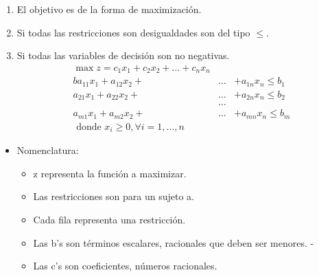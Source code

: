 \documentclass[12pt, twoside, openright]{report} %
\begin{document}
    \begin{enumerate}
    \def\labelenumi{\arabic{enumi}.}
    \item
      El objetivo es de la forma de maximización.
    \item
      Si todas las restricciones son desigualdades son del tipo $\leq$.
    \item
      Si todas las variables de decisión son no negativas.
	  \begin{eqnarray*} 
		\max z = c_1x_1+c_2x_2 + \ldots +c_nx_n \\ 
		ba_{11}x_1 +a_{12}x_2 +&\ldots& +a_{1n}x_n \leq b_1 \\ 
		a_{21}x_1 +a_{22}x_2 +&\ldots& +a_{2n}x_n \leq b_2 \\ 
		&\ldots& \\ 
		a_{m1}x_1 +a_{m2}x_2 +&\ldots& +a_{mn}x_n \leq b_m \\ 
		\text { donde } x_{i} \geq 0, \forall i=1, \ldots, n
	  \end{eqnarray*}
    \end{enumerate}

    \begin{itemize}
  
    \item
      Nomenclatura:

      \begin{itemize}
    
      \item
        z representa la función a maximizar.
      \item
        Las restricciones son para un sujeto a.
      \item
        Cada fila representa una restricción.
		\item Las b's son términos escalares, racionales que deben ser menores. -
		\item Las c's son coeficientes, números racionales.
      \end{itemize}
    \end{itemize}    
\end{document}
